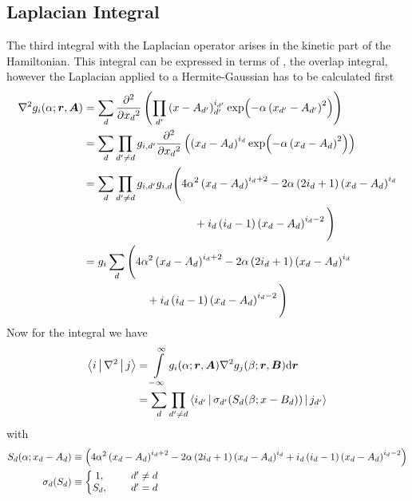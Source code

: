 \subsection{Laplacian Integral}
    The third integral with the Laplacian operator arises in the kinetic part
    of the Hamiltonian. This integral can be expressed in terms of
    , the overlap integral, however the Laplacian applied
    to a Hermite-Gaussian has to be calculated first
        \begin{align}
            \nabla^2 g_i(\alpha;\blds{r},\blds{A}) &= \sum_d \prd{x_d}[][2]
            \left(\prod_{d'} \left(x - A_{d'}\right)^{i_{d'}}_{d'} \exp(-\alpha
            \left(x_{d'} - A_{d'}\right)^2)\right)\nonumber \\
            &= \sum_d \prod_{d'\neq d} g_{i,d'} \prd{x_d}[][2]\left(\left(x_d -
            A_d\right)^{i_d} \exp(-\alpha \left(x_d - A_d\right)^2)\right)
            \nonumber \\
            &= \sum_d \prod_{d'\neq d} g_{i,d'} g_{i,d}
            \Bigg(4\alpha^2\left(x_d-A_d\right)^{i_d+2} -
            2\alpha\left(2i_d+1\right)\left(x_d-A_d\right)^{i_d} \nonumber \\ 
            &\hspace{3.5cm}+
            i_d\left(i_d-1\right)\left(x_d-A_d\right)^{i_d-2}\Bigg) \nonumber
            \\
            &= g_i\sum_d \Bigg(4\alpha^2\left(x_d-A_d\right)^{i_d+2} -
            2\alpha\left(2i_d+1\right)\left(x_d-A_d\right)^{i_d} \nonumber \\
            &\hspace{2.0cm}+
            i_d\left(i_d-1\right)\left(x_d-A_d\right)^{i_d-2}\Bigg)
        \end{align}
    Now for the integral we have
        \begin{align}
            \Braket{i|\nabla^2|j} &= \int\limits^{\infty}_{-\infty}
            g_i(\alpha;\boldsymbol{{r}},\boldsymbol{{A}})\nabla^2g_j(\beta;\boldsymbol{{r}},\boldsymbol{{B}}) 
            \mathrm{d}\boldsymbol{{r}} \nonumber \\
            &= \sum_d\prod_{d'\neq d}
            \Braket{i_{d'}|\sigma_{d'}(S_d(\beta;x-B_d))|j_{d'}}
            \label{eq:laplacianIntegral}
        \end{align}
    with
        \begin{equation}
            \begin{aligned}
                S_d(\alpha;x_d-A_d) &\equiv
                \left(4\alpha^2\left(x_d-A_d\right)^{i_d+2} -
                2\alpha\left(2i_d+1\right)\left(x_d-A_d\right)^{i_d} +
                i_d\left(i_d-1\right)\left(x_d-A_d\right)^{i_d-2}\right) \\
                \sigma_d(S_d) &\equiv \left\{\begin{matrix}
                                            1,&\indent d' \neq d \\
                                            S_d,&\indent d' = d
                                            \end{matrix}
                                        \right.
            \end{aligned}
        \end{equation}
